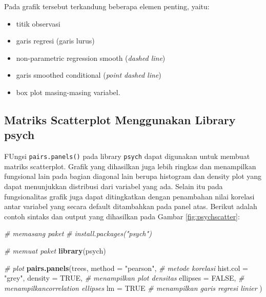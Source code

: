 \documentclass[]{book}
\newenvironment{Shaded}{\begin{snugshade}}{\end{snugshade}}
\newcommand{\KeywordTok}[1]{\textcolor[rgb]{0.13,0.29,0.53}{\textbf{#1}}}
\newcommand{\DataTypeTok}[1]{\textcolor[rgb]{0.13,0.29,0.53}{#1}}
\newcommand{\StringTok}[1]{\textcolor[rgb]{0.31,0.60,0.02}{#1}}
\newcommand{\CommentTok}[1]{\textcolor[rgb]{0.56,0.35,0.01}{\textit{#1}}}
\newcommand{\OtherTok}[1]{\textcolor[rgb]{0.56,0.35,0.01}{#1}}
\newcommand{\NormalTok}[1]{#1}
\providecommand{\tightlist}{%
  \setlength{\itemsep}{0pt}\setlength{\parskip}{0pt}}
\begin{document}
Pada grafik tersebut terkandung beberapa elemen penting, yaitu:

\begin{itemize}
\tightlist
\item
  titik observasi
\item
  garis regresi (garis lurus)
\item
  non-parametric regression smooth (\emph{dashed line})
\item
  garis smoothed conditional (\emph{point dashed line})
\item
  box plot masing-masing variabel.
\end{itemize}

\subsection{Matriks Scatterplot Menggunakan Library
psych}\label{matriks-scatterplot-menggunakan-library-psych}

FUngsi \texttt{pairs.panels()} pada library \texttt{psych} dapat
digunakan untuk membuat matriks scatterplot. Grafik yang dihasilkan juga
lebih ringkas dan menampilkan fungsional lain pada bagian diagonal lain
berupa histogram dan density plot yang dapat menunjukkan distribusi dari
variabel yang ada. Selain itu pada fungsionalitas grafik juga dapat
ditingkatkan dengan penambahan nilai korelasi antar variabel yang secara
default ditambahkan pada panel atas. Berikut adalah contoh sintaks dan
output yang dihasilkan pada Gambar \ref{fig:psychscatter}:

\begin{Shaded}
\begin{Highlighting}[]
\CommentTok{# memasang paket}
\CommentTok{# install.packages("psych")}

\CommentTok{# memuat paket}
\KeywordTok{library}\NormalTok{(psych)}

\CommentTok{# plot}
\KeywordTok{pairs.panels}\NormalTok{(trees, }
             \DataTypeTok{method =} \StringTok{"pearson"}\NormalTok{, }\CommentTok{# metode korelasi}
             \DataTypeTok{hist.col =} \StringTok{"grey"}\NormalTok{,}
             \DataTypeTok{density =} \OtherTok{TRUE}\NormalTok{,  }\CommentTok{# menampilkan plot densitas}
             \DataTypeTok{ellipses =} \OtherTok{FALSE}\NormalTok{, }\CommentTok{# menampilkancorrelation ellipses}
             \DataTypeTok{lm =} \OtherTok{TRUE} \CommentTok{# menampilkan garis regresi linier}
\NormalTok{             )}
\end{Highlighting}
\end{Shaded}
\end{document}
